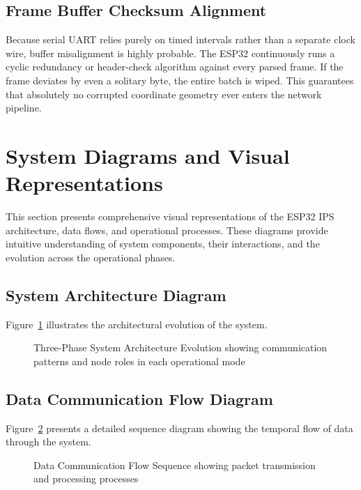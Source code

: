 \subsection{Frame Buffer Checksum Alignment}
\label{subsec:mesh-synchronization}

Because serial UART relies purely on timed intervals rather than a separate clock wire, buffer misalignment is highly probable. The ESP32 continuously runs a cyclic redundancy or header-check algorithm against every parsed frame. If the frame deviates by even a solitary byte, the entire batch is wiped. This guarantees that absolutely no corrupted coordinate geometry ever enters the network pipeline.

\section{System Diagrams and Visual Representations}
\label{sec:system-diagrams}

This section presents comprehensive visual representations of the ESP32 IPS architecture, data flows, and operational processes. These diagrams provide intuitive understanding of system components, their interactions, and the evolution across the operational phases.

\subsection{System Architecture Diagram}
\label{subsec:system-architecture-diagram}

Figure~\ref{fig:system-architecture} illustrates the architectural evolution of the system.

\begin{figure}[htbp]
    \centering
    \resizebox{0.95\textwidth}{!}{}
    \caption{Three-Phase System Architecture Evolution showing communication patterns and node roles in each operational mode}
    \label{fig:system-architecture}
\end{figure}

\subsection{Data Communication Flow Diagram}
\label{subsec:data-flow-diagram}

Figure~\ref{fig:data-communication-flow} presents a detailed sequence diagram showing the temporal flow of data through the system.

\begin{figure}[htbp]
    \centering
    \resizebox{0.9\textwidth}{!}{}
    \caption{Data Communication Flow Sequence showing packet transmission and processing processes}
    \label{fig:data-communication-flow}
\end{figure}

